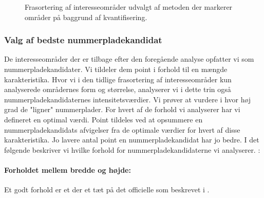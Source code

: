 \begin{figure}[htbp]
  \centering
  \begin{minipage}[b]{5 cm}
  \end{minipage}
  \begin{minipage}[b]{5 cm}
  \end{minipage}
  \caption{Frasortering af interesseområder udvalgt af metoden der markerer områder på baggrund af kvantifisering.}
   \label{fig:DetectQuant-cleanup}
\end{figure}


\subsubsection{Valg af bedste nummerpladekandidat}
\label{sec:GetBestCandidate}
De interesseområder der er tilbage efter den foregående analyse opfatter vi som nummerpladekandidater. Vi tildeler dem point i forhold til en mængde karakteristika. Hvor vi i den tidlige frasortering af interesseområder kun analyserede områdernes form og størrelse, analyserer vi i dette trin også nummerpladekandidaternes intensitetsværdier. Vi prøver at vurdere i hvor høj grad de "ligner" nummerplader. For hvert af de forhold vi analyserer har vi defineret en optimal værdi. Point tildeles ved at opsummere en nummerpladekandidats afvigelser fra de optimale værdier for hvert af disse karakteristika. Jo lavere antal point en nummerpladekandidat har jo bedre. I det følgende beskriver vi hvilke forhold for nummerpladekandidaterne vi analyserer. :

\paragraph*{Forholdet mellem bredde og højde:}
Et godt forhold er et der et tæt på det officielle som beskrevet i \cite{dkplates}.

